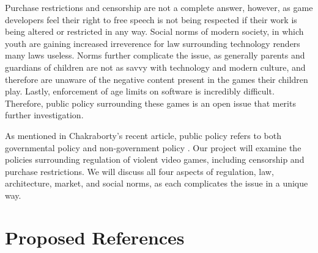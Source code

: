 \documentclass[12pt]{article}
\begin{document}
Purchase restrictions and censorship are not a complete answer, however, as game developers feel their right to free speech is not being respected if their work is being altered or restricted in any way. Social norms of modern society, in which youth are gaining increased irreverence for law surrounding technology renders many laws useless. Norms further complicate the issue, as generally parents and guardians of children are not as savvy with technology and modern culture, and therefore are unaware of the negative content present in the games their children play. Lastly, enforcement of age limits on software is incredibly difficult. Therefore, public policy surrounding these games is an open issue that merits further investigation.

As mentioned in Chakraborty's recent article, public policy refers to both governmental policy and non-government policy \cite{chakraborty2015}. Our project will examine the policies surrounding regulation of violent video games, including censorship and purchase restrictions. We will discuss all four aspects of regulation, law, architecture, market, and social norms, as each complicates the issue in a unique way.
\section*{Proposed References}
\nocite{*}

\end{document}
